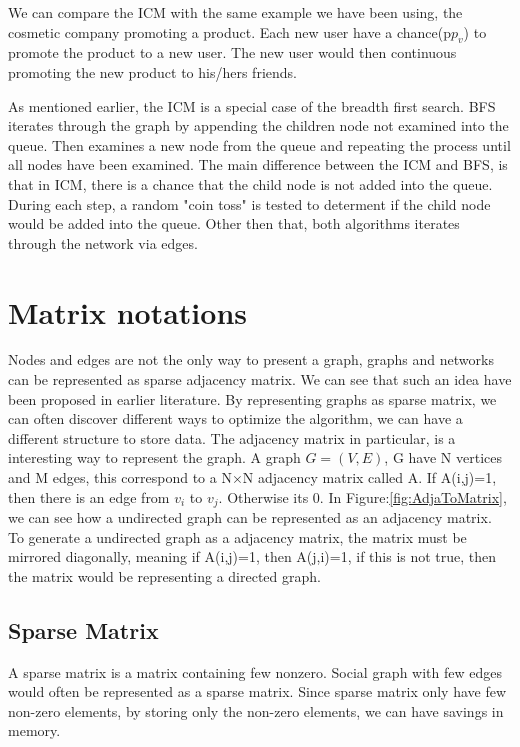 {We can compare the ICM with the same example we have been using, the cosmetic company promoting a product. Each new user have a chance(p$p_v$) to promote the product to a new user. The new user would then continuous promoting the new product to his/hers friends. 

As mentioned earlier, the ICM is a special case of the breadth first search. BFS iterates through the graph by appending the children node not examined into the queue. Then examines a new node from the queue and repeating the process until all nodes have been examined. The main difference between the ICM and BFS, is that in ICM, there is a chance that the child node is not added into the queue. During each step, a random "coin toss" is tested to determent if the child node would be added into the queue. Other then that, both algorithms iterates through the network via edges.

\section{Matrix notations}
Nodes and edges are not the only way to present a graph, graphs and networks can be represented as sparse adjacency matrix\cite{MathTolAgo}. We can see that such an idea have been proposed in earlier literature\cite{McAndrew1963}. By representing graphs as sparse matrix, we can often discover different ways to optimize the algorithm, we can have a different structure to store data. The adjacency matrix in particular, is a interesting way to represent the graph. A graph $G =(V,E)$, G have N vertices and M edges, this correspond to a N$\times$N adjacency matrix called A. If A(i,j)=1, then there is an edge from $v_i$ to $v_j$. Otherwise its 0. In Figure:\ref{fig:AdjaToMatrix}, we can see how a undirected graph can be represented as an adjacency matrix. To generate a undirected graph as a adjacency matrix, the matrix must be mirrored diagonally, meaning if A(i,j)=1, then A(j,i)=1, if this is not true, then the matrix would be representing a directed graph.

\subsection{Sparse Matrix}
A sparse matrix is a matrix containing few nonzero. Social graph with few edges would often be represented as a sparse matrix. Since sparse matrix only have few non-zero elements, by storing only the non-zero elements, we can have savings in memory.

}
